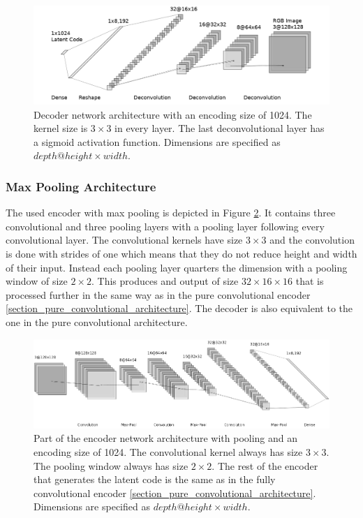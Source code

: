 \begin{figure}[h]
    \centering
    \includegraphics[width=\textwidth]{images/figures/decoder_neural_network.png}
    \caption{Decoder network architecture with an encoding size of 1024.
    The kernel size is $3\times 3$ in every layer. The last deconvolutional layer has a sigmoid activation
    function. Dimensions are specified as $depth@height\times width$.} \label{figure_decoder}
\end{figure}

\subsubsection{Max Pooling Architecture}

The used encoder with max pooling is depicted in Figure \ref{figure_encoder_pooling}. It contains three
convolutional and three pooling layers with a pooling layer following every convolutional layer. The convolutional
kernels have size $3\times3$ and the convolution is done with strides of one which means that they do not reduce
height and width of their input. Instead each pooling layer quarters the dimension with a pooling window of size
$2\times 2$. This produces and output of size $32\times16\times16$ that is processed further in the same way
as in the pure convolutional encoder \ref{section_pure_convolutional_architecture}.
The decoder is also equivalent to the one in the pure convolutional architecture.

\begin{figure}[h]
    \centering
    \includegraphics[width=\textwidth]{images/figures/encoder_pooling.png}
    \caption{Part of the encoder network architecture with pooling and an encoding size of 1024.
    The convolutional kernel always has size $3\times 3$. The pooling window always has size $2\times 2$.
    The rest of the encoder that generates the latent code is the same as in the fully convolutional encoder
    \ref{section_pure_convolutional_architecture}.
    Dimensions are specified as $depth@height\times width$.} \label{figure_encoder_pooling}
\end{figure}

